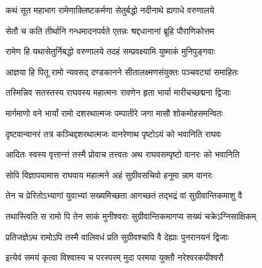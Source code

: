 
\tags{}

\storymeta





\twolineshloka
{कथं सूत महाभाग रामेणाक्लिष्टकर्मणा}
{सेतुर्बद्धो नदीनाथे ह्यगाधे वरुणालये}%

\twolineshloka
{सेतौ च कति तीर्थानि गन्धमादनपर्वते}
{एतन्नः श्रद्दधानानां ब्रूहि पौराणिकोत्तम}%


\twolineshloka
{रामेण हि यथासेतुर्निबद्धो वरुणालये}
{तदहं सम्प्रवक्ष्यामि युष्माकं मुनिपुङ्गवाः}%

\twolineshloka
{आज्ञया हि पितू रामो न्यवसद् दण्डकानने}
{सीतालक्ष्मणसंयुक्तः पञ्चवट्यां समाहितः}%

\twolineshloka
{तस्मिन्निव सतस्तस्य राघवस्य महात्मनः}
{रावणेन हृता भार्या मारीचच्छद्मना द्विजाः}%

\twolineshloka
{मार्गमाणो वने भार्यां रामो दशरथात्मजः}
{पम्पातीरे जगा मासौ शोकमोहसमन्वितः}%

\twolineshloka
{दृष्टवान्वानरं तत्र कञ्चिद्दशरथात्मजः}
{वानरेणाथ पृष्टोऽयं को भवानिति राघवः}%

\twolineshloka
{आदितः स्वस्य वृत्तान्त्तं तस्मै प्रोवाच तत्त्वतः}
{अथ राघवसम्पृष्टो वानरः को भवानिति}%

\twolineshloka
{सोपि विज्ञापयामास राघवाय महात्मने}
{अहं सुग्रीवसचिवो हनूमा न्नाम वानरः}%

\twolineshloka
{तेन च प्रेरितोऽभ्यागां युवाभ्यां सख्यमिच्छता}
{आगच्छतं तद्भद्रं वां सुग्रीवान्तिकमाशु वै}%

\twolineshloka
{तथास्त्विति स रामो पि तेन साकं मुनीश्वराः}
{सुग्रीवान्तिकमागप्य सख्यं चक्रेऽग्निसाक्षिकम्}%

\twolineshloka
{प्रतिजज्ञेऽथ रामोऽपि तस्मै वालिवधं प्रति}
{सुग्रीवश्चापि वै देह्याः पुनरानयनं द्विजाः}%

\twolineshloka
{इत्येवं समयं कृत्वा विश्वास्य च परस्परम्}
{मुदा परमया युक्तौ नरेश्वरकपीश्वरौ}%

